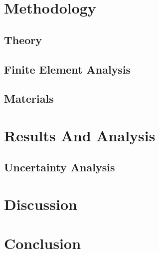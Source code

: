 \documentclass[a4paper,12pt]{article}
\begin{document}
\section{Methodology} \label{Methodology}%
    \subsection{Theory}
    \subsection{Finite Element Analysis} \label{FEA}
    \subsection{Materials}


\section{Results And Analysis}%
    \subsection{Uncertainty Analysis}

\section{Discussion}%

\section{Conclusion}%


\printbibliography
\end{document}
